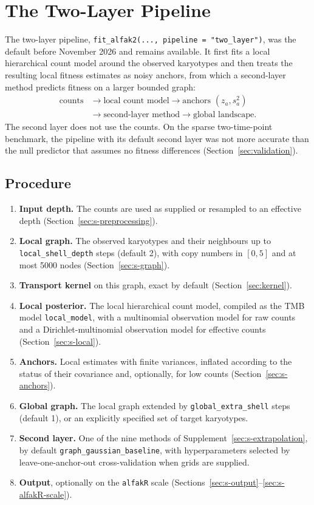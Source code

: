 \documentclass[11pt]{article}
\begin{document}
\section{The Two-Layer Pipeline}
\label{sec:s-two-layer}

The two-layer pipeline, \texttt{fit\_alfak2(..., pipeline = "two\_layer")},
was the default before November 2026 and remains available. It first fits a
local hierarchical count model around the observed karyotypes and then treats
the resulting local fitness estimates as noisy anchors, from which a
second-layer method predicts fitness on a larger bounded graph:
\[
\begin{aligned}
\text{counts}&\longrightarrow\text{local count model}\longrightarrow
\text{anchors }(z_a,s_a^2)\\
&\longrightarrow\text{second-layer method}\longrightarrow\text{global landscape}.
\end{aligned}
\]
The second layer does not use the counts. On the sparse two-time-point benchmark,
the pipeline with its default second layer was not more accurate than the
null predictor that assumes no fitness differences
(Section~\ref{sec:validation}).

\subsection{Procedure}

\begin{enumerate}
\item \textbf{Input depth.} The counts are used as supplied or resampled to an
effective depth (Section~\ref{sec:s-preprocessing}).
\item \textbf{Local graph.} The observed karyotypes and their neighbours up to
\texttt{local\_shell\_depth} steps (default 2), with copy numbers in $[0,5]$
and at most 5000 nodes (Section~\ref{sec:s-graph}).
\item \textbf{Transport kernel} on this graph, exact by default
(Section~\ref{sec:kernel}).
\item \textbf{Local posterior.} The local hierarchical count model, compiled as
the TMB model \texttt{local\_model}, with a multinomial observation model for
raw counts and a Dirichlet-multinomial observation model for effective counts
(Section~\ref{sec:s-local}).
\item \textbf{Anchors.} Local estimates with finite variances, inflated
according to the status of their covariance and, optionally, for low counts
(Section~\ref{sec:s-anchors}).
\item \textbf{Global graph.} The local graph extended by
\texttt{global\_extra\_shell} steps (default 1), or an explicitly specified
set of target karyotypes.
\item \textbf{Second layer.} One of the nine methods of
Supplement~\ref{sec:s-extrapolation}, by default
\texttt{graph\_gaussian\_baseline}, with hyperparameters selected by
leave-one-anchor-out cross-validation when grids are supplied.
\item \textbf{Output}, optionally on the \texttt{alfakR} scale
(Sections~\ref{sec:s-output}--\ref{sec:s-alfakR-scale}).
\end{enumerate}
\end{document}
